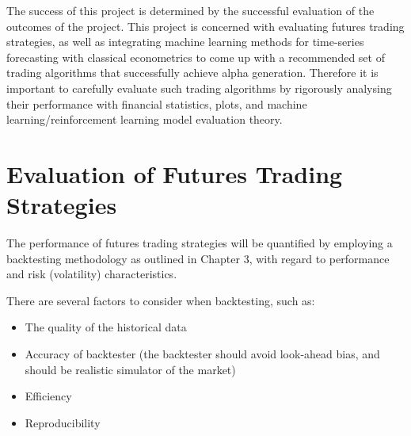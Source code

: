 
The success of this project is determined by the successful evaluation of the outcomes of the project. This project is concerned with evaluating futures trading strategies, as well as integrating machine learning methods for time-series forecasting with classical econometrics to come up with a recommended set of trading algorithms that successfully achieve alpha generation. Therefore it is important to carefully evaluate such trading algorithms by rigorously analysing their performance with financial statistics, plots, and machine learning/reinforcement learning model evaluation theory.

\section{Evaluation of Futures Trading Strategies}
The performance of futures trading strategies will be quantified by employing a backtesting methodology as outlined in Chapter 3, with regard to performance and risk (volatility) characteristics.

There are several factors to consider when backtesting, such as:
\begin{itemize}
\item The quality of the historical data
\item Accuracy of backtester (the backtester should avoid look-ahead bias, and should be realistic simulator of the market)
\item Efficiency
\item Reproducibility
\end{itemize}
